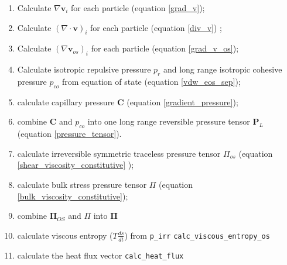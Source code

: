 \begin{enumerate}
\item Calculate $\nabla \mathbold{v}_i$ for each particle 
    (equation \ref{grad_v});
\item Calculate $\left(\nabla \cdot \mathbold{v}\right)_{i}$ for each particle 
    (equation \ref{div_v}) ;
\item Calculate $\left(\nabla \mathbold{v}_{os}\right)_{i}$ for each particle 
    (equation \ref{grad_v_os});
\item Calculate isotropic repulsive pressure $p_{r}$ and long range isotropic
    cohesive pressure $p_{co}$ from equation of state 
    (equation \ref{vdw_eos_sep});
\item calculate capillary pressure $\mathbold{C}$ 
    (equation \ref{gradient_pressure});
\item combine $\mathbold{C}$ and $p_{co}$ into one long range reversible
    pressure tensor $\mathbf{P}_{L}$ 
    (equation \ref{pressure_tensor}).
\item calculate irreversible symmetric traceless pressure tensor $\Pi_{os}$
    (equation \ref{shear_viscosity_constitutive} );
\item calculate bulk stress pressure tensor $\Pi$ 
    (equation \ref{bulk_viscosity_constitutive});
\item combine $\mathbold{\Pi}_{OS}$ and $\Pi$ into $\mathbold{\Pi}$
\item calculate viscous entropy ($T\frac{ds}{dt}$) from \texttt{p\_irr}
    \texttt{calc\_viscous\_entropy\_os}
\item calculate the heat flux vector \texttt{calc\_heat\_flux}
\end{enumerate}	

